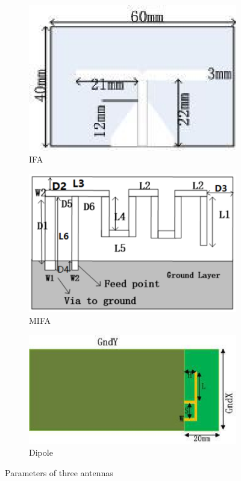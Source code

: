 \documentclass[journal]{IEEEtran}
\begin{document}
\begin{figure}[!htb]
\centering
\begin{subfigure}[b]{0.24\textwidth}
\includegraphics[width=\textwidth]{figs/1c.eps}
\caption{IFA}
\label{fig:a}	
\end{subfigure}		
\begin{subfigure}[b]{0.24\textwidth}
\includegraphics[width=\textwidth]{figs/1b.eps}
\caption{MIFA}
\label{fig:b}
\end{subfigure}
\begin{subfigure}[b]{0.4\textwidth}
\includegraphics[width=\textwidth]{figs/1a.eps}
\caption{Dipole}
\label{fig:c}
\end{subfigure}
\caption{Parameters of  three antennas}
\label{fig:1}
\end{figure}
\end{document}
